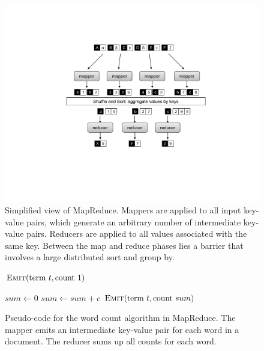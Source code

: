 \begin{figure}[p]
\begin{center}
\vspace{0.2cm}
\includegraphics[scale=0.6]{figures/fig-ch2-MapReduce-simple.pdf}
\vspace{-0.3cm}
\end{center}
\caption{Simplified view of MapReduce.  Mappers are applied to all
  input key-value pairs, which generate an arbitrary number of
  intermediate key-value pairs.  Reducers are applied to all values
  associated with the same key.  Between the map and reduce phases
  lies a barrier that involves a large distributed sort and group by.}
\label{figure:chapter2:MapReduce-simple}
\end{figure}

\begin{figure}[p]
\algrenewcommand{}
\algrenewcommand{}
  \begin{algorithmic}[1]
    \State $\textsc{Emit}(\textrm{term }t, \textrm{count }1)$
    \EndFor
    \EndProcedure
    \EndFunction
  \end{algorithmic}

  \begin{algorithmic}[1]
    \State $sum \gets 0$
    \State $sum \gets sum + c$
    \EndFor
    \State $\textsc{Emit}(\textrm{term }t, \textrm{count }sum)$
    \EndProcedure
    \EndFunction
  \end{algorithmic}
  \caption{Pseudo-code for the word count algorithm in MapReduce.  The
    mapper emits an intermediate key-value pair for each word in a
    document.  The reducer sums up all counts for each word.}
\label{chapter2:word-count:basic}
\end{figure}

